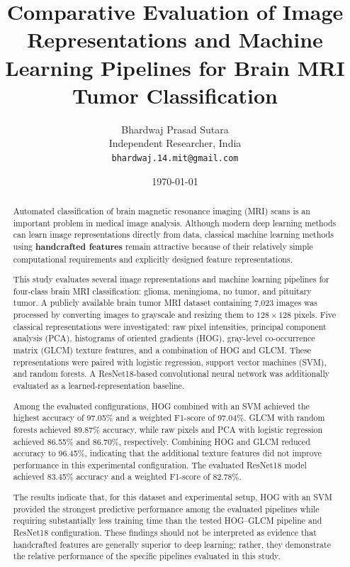 \documentclass[11pt,a4paper]{article}
\title{
    \textbf{Comparative Evaluation of Image Representations and Machine Learning Pipelines for Brain MRI Tumor Classification}
}
\author{
    Bhardwaj Prasad Sutara\\
    Independent Researcher, India\\
    \texttt{bhardwaj.14.mit@gmail.com}
}
\date{\today}
\begin{document}
\maketitle


\begin{abstract}

Automated classification of brain magnetic resonance imaging (MRI) scans is an important problem in medical image analysis. Although modern deep learning methods can learn image representations directly from data, classical machine learning methods using \textbf{handcrafted features} remain attractive because of their relatively simple computational requirements and explicitly designed feature representations.

This study evaluates several image representations and machine learning pipelines for four-class brain MRI classification: glioma, meningioma, no tumor, and pituitary tumor. A publicly available brain tumor MRI dataset containing 7,023 images was processed by converting images to grayscale and resizing them to $128 \times 128$ pixels. Five classical representations were investigated: raw pixel intensities, principal component analysis (PCA), histograms of oriented gradients (HOG), gray-level co-occurrence matrix (GLCM) texture features, and a combination of HOG and GLCM. These representations were paired with logistic regression, support vector machines (SVM), and random forests. A ResNet18-based convolutional neural network was additionally evaluated as a learned-representation baseline.

Among the evaluated configurations, HOG combined with an SVM achieved the highest accuracy of 97.05\% and a weighted F1-score of 97.04\%. GLCM with random forests achieved 89.87\% accuracy, while raw pixels and PCA with logistic regression achieved 86.55\% and 86.70\%, respectively. Combining HOG and GLCM reduced accuracy to 96.45\%, indicating that the additional texture features did not improve performance in this experimental configuration. The evaluated ResNet18 model achieved 83.45\% accuracy and a weighted F1-score of 82.78\%.

The results indicate that, for this dataset and experimental setup, HOG with an SVM provided the strongest predictive performance among the evaluated pipelines while requiring substantially less training time than the tested HOG--GLCM pipeline and ResNet18 configuration. These findings should not be interpreted as evidence that handcrafted features are generally superior to deep learning; rather, they demonstrate the relative performance of the specific pipelines evaluated in this study.

\end{abstract}
\end{document}
